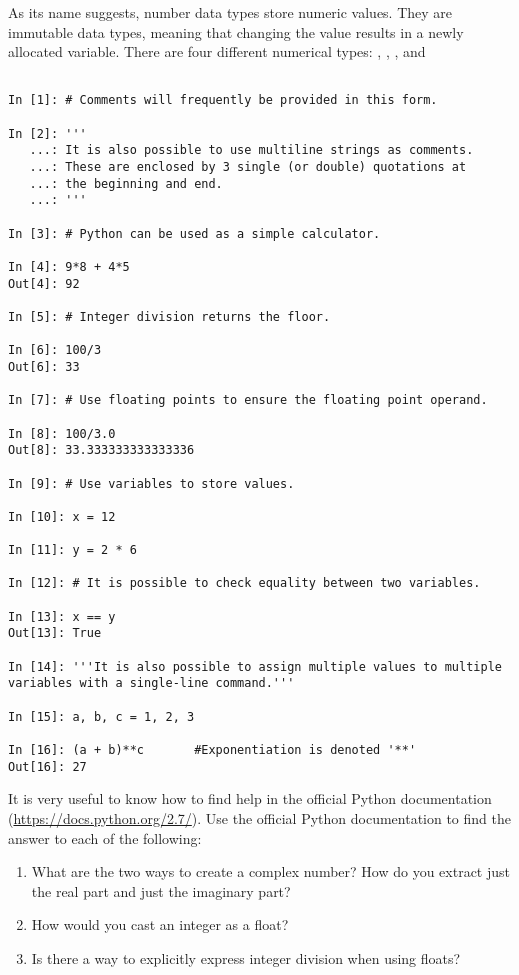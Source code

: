 \begin{example}
As its name suggests, number data types store numeric values. 
They are immutable data types, meaning that changing the value results in a 
newly allocated variable.
There are four different numerical types: , , 
, and 

\begin{lstlisting}

In [1]: # Comments will frequently be provided in this form. 

In [2]: '''
   ...: It is also possible to use multiline strings as comments. 
   ...: These are enclosed by 3 single (or double) quotations at 
   ...: the beginning and end. 
   ...: '''

In [3]: # Python can be used as a simple calculator.

In [4]: 9*8 + 4*5
Out[4]: 92

In [5]: # Integer division returns the floor.

In [6]: 100/3
Out[6]: 33

In [7]: # Use floating points to ensure the floating point operand.

In [8]: 100/3.0
Out[8]: 33.333333333333336

In [9]: # Use variables to store values.

In [10]: x = 12

In [11]: y = 2 * 6

In [12]: # It is possible to check equality between two variables.

In [13]: x == y
Out[13]: True

In [14]: '''It is also possible to assign multiple values to multiple variables with a single-line command.'''
		
In [15]: a, b, c = 1, 2, 3

In [16]: (a + b)**c       #Exponentiation is denoted '**'
Out[16]: 27

\end{lstlisting}
\end{example}

\begin{problem}
It is very useful to know how to find help in the official Python documentation  (\url{https://docs.python.org/2.7/}). Use the official Python documentation to find the answer to each of the following:

\begin{enumerate}

\item What are the two ways to create a complex number? 
How do you extract just the real part and just the imaginary part?
\item How would you cast an integer as a float?
\item Is there a way to explicitly express integer division when using floats?
\end{enumerate}
\end{problem}

